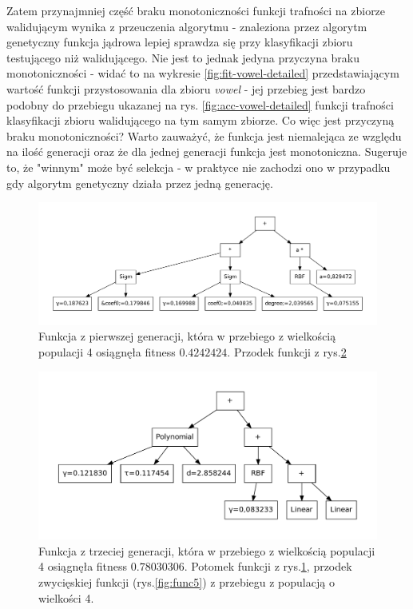 	Zatem przynajmniej część braku monotoniczności funkcji trafności na zbiorze walidującym wynika z przeuczenia algorytmu - znaleziona przez algorytm genetyczny funkcja jądrowa lepiej sprawdza się przy klasyfikacji zbioru testującego niż walidującego. Nie jest to jednak jedyna przyczyna braku monotoniczności - widać to na wykresie \ref{fig:fit-vowel-detailed} przedstawiającym wartość funkcji przystosowania dla zbioru \emph{vowel} - jej przebieg jest bardzo podobny do przebiegu ukazanej na rys. \ref{fig:acc-vowel-detailed} funkcji trafności klasyfikacji zbioru walidującego na tym samym zbiorze. Co więc jest przyczyną braku monotoniczności? Warto zauważyć, że funkcja jest niemalejąca ze względu na ilość generacji oraz że dla jednej generacji funkcja jest monotoniczna. Sugeruje to, że "winnym" może być selekcja - w praktyce nie zachodzi ono w przypadku gdy algorytm genetyczny działa przez jedną generację.
    
    \begin{figure}
		\includegraphics[scale=0.50]{figures/functions/func1}
		\caption{Funkcja z pierwszej generacji, która w przebiego z wielkością populacji 4 osiągnęła fitness $0.4242424$. Przodek funkcji z rys.\ref{fig:func2} \label{fig:func1}}
	\end{figure}
	
	\begin{figure}
		\includegraphics[scale=0.60]{figures/functions/func2}
		\caption{Funkcja z trzeciej generacji, która w przebiego z wielkością populacji 4 osiągnęła fitness $0.78030306$. Potomek funkcji z rys.\ref{fig:func1}, przodek zwycięskiej funkcji (rys.\ref{fig:func5}) z przebiegu z populacją o wielkości 4.\label{fig:func2}}
	\end{figure}
          
